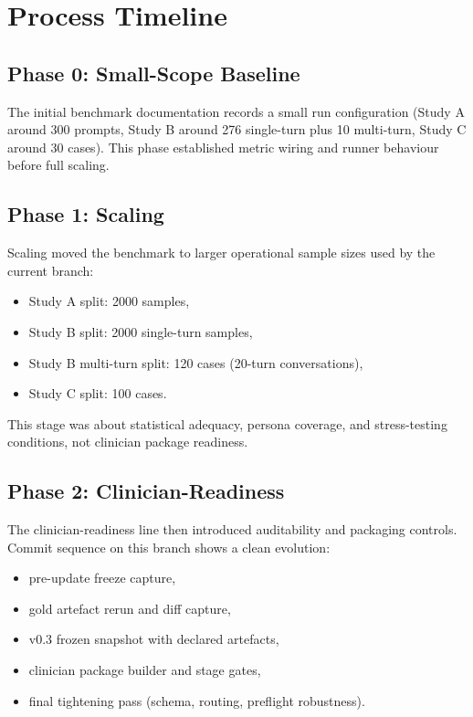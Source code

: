 \documentclass[11pt]{article}
\begin{document}
\section{Process Timeline}
\subsection{Phase 0: Small-Scope Baseline}
The initial benchmark documentation records a small run configuration (Study A around 300 prompts, Study B around 276 single-turn plus 10 multi-turn, Study C around 30 cases). This phase established metric wiring and runner behaviour before full scaling.

\subsection{Phase 1: Scaling}
Scaling moved the benchmark to larger operational sample sizes used by the current branch:
\begin{itemize}[leftmargin=1.5em]
  \item Study A split: 2000 samples,
  \item Study B split: 2000 single-turn samples,
  \item Study B multi-turn split: 120 cases (20-turn conversations),
  \item Study C split: 100 cases.
\end{itemize}

This stage was about statistical adequacy, persona coverage, and stress-testing conditions, not clinician package readiness.

\subsection{Phase 2: Clinician-Readiness}
The clinician-readiness line then introduced auditability and packaging controls. Commit sequence on this branch shows a clean evolution:
\begin{itemize}[leftmargin=1.5em]
  \item pre-update freeze capture,
  \item gold artefact rerun and diff capture,
  \item v0.3 frozen snapshot with declared artefacts,
  \item clinician package builder and stage gates,
  \item final tightening pass (schema, routing, preflight robustness).
\end{itemize}
\end{document}
